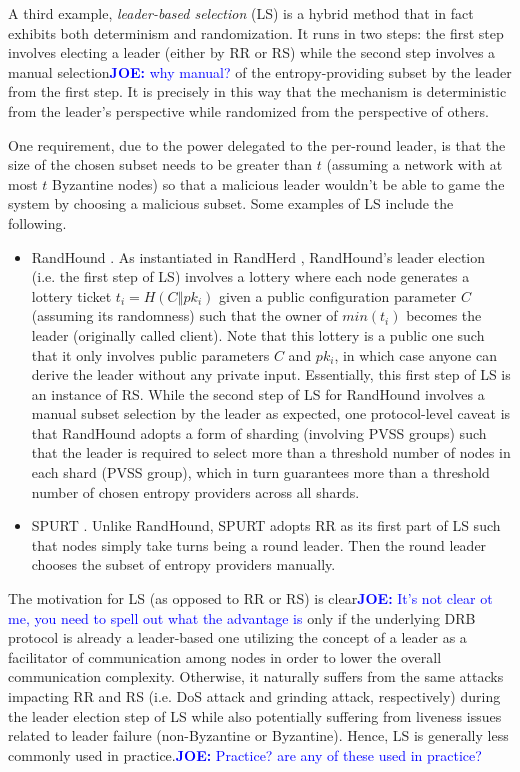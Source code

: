 \documentclass[letterpaper,twocolumn,10pt]{article}
\theoremstyle{definition}
\theoremstyle{remark}
\newcommand{\joenote}[1]{\textcolor{blue}{\textbf{JOE:} #1}}
\begin{document}
A third example, \textit{leader-based selection} (LS) is a hybrid method that in fact exhibits both determinism and randomization. It runs in two steps: the first step involves electing a leader (either by RR or RS) while the second step involves a manual selection\joenote{why manual?} of the entropy-providing subset by the leader from the first step. It is precisely in this way that the mechanism is deterministic from the leader's perspective while randomized from the perspective of others.

One requirement, due to the power delegated to the per-round leader, is that the size of the chosen subset needs to be greater than $t$ (assuming a network with at most $t$ Byzantine nodes) so that a malicious leader wouldn't be able to game the system by choosing a malicious subset. Some examples of LS include the following.
\begin{itemize}
\item RandHound \cite{syta2017scalable}. As instantiated in RandHerd \cite{syta2017scalable}, RandHound's leader election (i.e. the first step of LS) involves a lottery where each node generates a lottery ticket $t_i = H(C \mathbin\Vert pk_i)$ given a public configuration parameter $C$ (assuming its randomness) such that the owner of $min(t_i)$ becomes the leader (originally called client). Note that this lottery is a public one such that it only involves public parameters $C$ and $pk_i$, in which case anyone can derive the leader without any private input. Essentially, this first step of LS is an instance of RS. While the second step of LS for RandHound involves a manual subset selection by the leader as expected, one protocol-level caveat is that RandHound adopts a form of sharding (involving PVSS groups) such that the leader is required to select more than a threshold number of nodes in each shard (PVSS group), which in turn guarantees more than a threshold number of chosen entropy providers across all shards.
\item SPURT \cite{das2021spurt}. Unlike RandHound, SPURT adopts RR as its first part of LS such that nodes simply take turns being a round leader. Then the round leader chooses the subset of entropy providers manually.
\end{itemize}

The motivation for LS (as opposed to RR or RS) is clear\joenote{It's not clear ot me, you need to spell out what the advantage is} only if the underlying DRB protocol is already a leader-based one utilizing the concept of a leader as a facilitator of communication among nodes in order to lower the overall communication complexity. Otherwise, it naturally suffers from the same attacks impacting RR and RS (i.e. DoS attack and grinding attack, respectively) during the leader election step of LS while also potentially suffering from liveness issues related to leader failure (non-Byzantine or Byzantine). Hence, LS is generally less commonly used in practice.\joenote{Practice? are any of these used in practice?}
\end{document}
